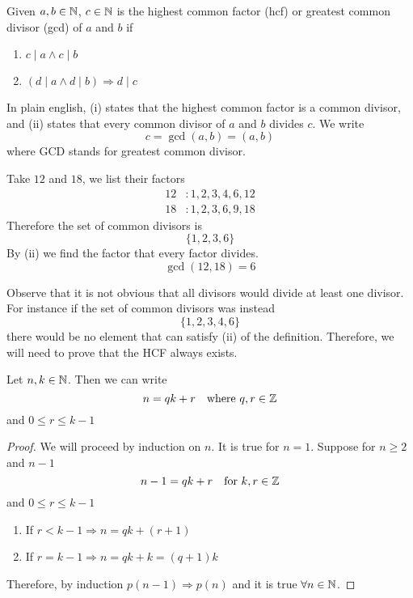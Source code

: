 \documentclass{article}
\begin{document}
\begin{defi}
    Given $a, b \in \mathbb{N}$, $c \in \mathbb{N}$ is the highest common factor (hcf) or greatest common divisor (gcd) of $a$ and $b$ if
    \begin{enumerate}
        \item $c \mid a \wedge c \mid b$
        \item $(d \mid a \wedge d \mid b) \Rightarrow d \mid c$ 
    \end{enumerate}
    In plain english, (i) states that the highest common factor is a common divisor, and (ii) states that every common divisor of $a$ and $b$ divides $c$. We write
    \[
        c = \gcd{(a, b)} = (a, b)    
    \]
    where GCD stands for greatest common divisor.
\end{defi}

\begin{eg}
    Take $12$ and $18$, we list their factors
    \begin{align*}
        12 &: 1, 2, 3, 4, 6, 12 \\
        18 &: 1, 2, 3, 6, 9, 18
    \end{align*}
    Therefore the set of common divisors is
    \[
        \{1, 2, 3, 6\}  
    \]
    By (ii) we find the factor that every factor divides. 
    \[
        \gcd{(12, 18)} = 6  
    \]
\end{eg}

\begin{remark}
    Observe that it is not obvious that all divisors would divide at least one divisor. For instance if the set of common divisors was instead
    \[
        \{1, 2, 3, 4, 6\}  
    \] 
    there would be no element that can satisfy (ii) of the definition. Therefore, we will need to prove that the HCF always exists.
\end{remark}

\begin{nprop}
    Let $n, k \in \mathbb{N}$. Then we can write 
    \[
        n = qk + r \quad \text{where} \ q, r \in \mathbb{Z}  
    \]
    and $0 \leq r \leq k - 1$
\end{nprop}

\begin{proof}
    We will proceed by induction on $n$. It is true for $n = 1$. Suppose for $n \geq 2$ and $n - 1$
    \[
        n-1 = qk + r \quad \text{for} \ k, r \in \mathbb{Z}    
    \]
    and $0 \leq r \leq k-1 $
    \begin{enumerate}[cases]
        \item If $r < k - 1 \Rightarrow n = qk + (r + 1)$
        \item If $r = k -1 \Rightarrow n = qk + k = (q+1)k$
    \end{enumerate}

    Therefore, by induction $p(n-1) \Rightarrow p(n)$ and it is true $\forall n \in \mathbb{N}$.
\end{proof}
\end{document}
